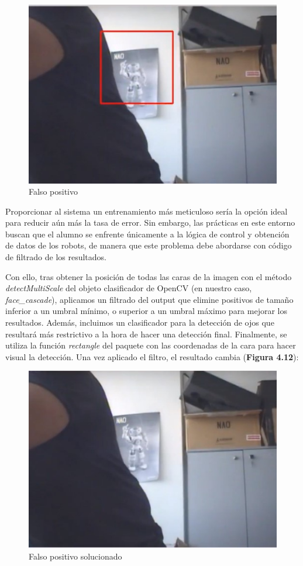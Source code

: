 \begin{figure}[H]
  \begin{center}
    \includegraphics[width=0.70\linewidth]{figures/falsopositivo.jpg}
		\caption{Falso positivo}
		\label{fig.falsopositivo}
		\end{center}
\end{figure}

Proporcionar al sistema un entrenamiento más meticuloso sería la opción ideal para reducir aún más la tasa de error. Sin embargo, las prácticas en este entorno buscan que el alumno se enfrente únicamente a la lógica de control y obtención de datos de los robots, de manera que este problema debe abordarse con código de filtrado de los resultados.

Con ello, tras obtener la posición de todas las caras de la imagen con el método \textit{detectMultiScale} del objeto clasificador de OpenCV (en nuestro caso, \textit{face\_cascade}), aplicamos un filtrado del output que elimine positivos de tamaño inferior a un umbral mínimo, o superior a un umbral máximo para mejorar los resultados. Además, incluimos un clasificador para la detección de ojos que resultará más restrictivo a la hora de hacer una detección final. Finalmente, se utiliza la función \textit{rectangle} del paquete con las coordenadas de la cara para hacer visual la detección. Una vez aplicado el filtro, el resultado cambia (\textbf{Figura 4.12}):

\begin{figure}[H]
  \begin{center}
    \includegraphics[width=0.70\linewidth]{figures/falsopositivosolved.jpg}
		\caption{Falso positivo solucionado}
		\label{fig.falsopositivosolved}
		\end{center}
\end{figure}

